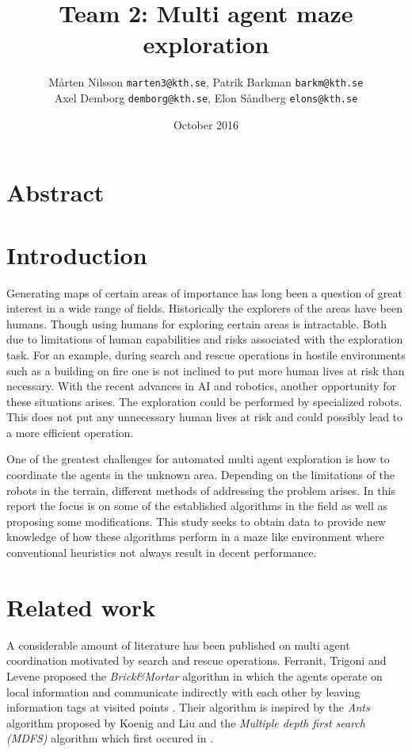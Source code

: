 \documentclass{article}
\title{Team 2: Multi agent maze exploration}
\author{ Mårten Nilsson \texttt{marten3@kth.se}, Patrik Barkman
  \texttt{barkm@kth.se} \\ Axel Demborg \texttt{demborg@kth.se}, Elon Såndberg
  \texttt{elons@kth.se}}
\date{October 2016}
\begin{document}
\maketitle

\section{Abstract}

\section{Introduction}

Generating maps of certain areas of importance has long been a question of great interest in a
wide range of fields. Historically the explorers of the areas have been humans.
Though using humans for exploring certain areas is intractable. Both due to
limitations of human capabilities and risks associated with the exploration
task. For an example, during search and rescue operations in hostile
environments such as a building on fire one is not inclined to put more human
lives at risk than necessary. With the recent advances in AI and robotics,
another opportunity for these situations arises. The exploration could be
performed by specialized robots. This does not put any unnecessary human lives
at risk and could possibly lead to a more efficient operation.

One of the greatest challenges for automated multi agent exploration is how to
coordinate the agents in the unknown area. Depending on the limitations of the
robots in the terrain, different methods of addressing the problem arises. In
this report the focus is on some of the established algorithms in the field as
well as proposing some modifications. This study seeks to obtain data to provide
new knowledge of how these algorithms perform in a maze like environment where
conventional heuristics not always result in decent performance.

\section{Related work}
A considerable amount of literature has been published on multi agent
coordination motivated by search and rescue operations. Ferranit, Trigoni and
Levene proposed the \textit{Brick\&Mortar} algorithm in which the agents operate
on local information and communicate indirectly with each other by leaving
information tags at visited points \cite{ferranti2007brick}. Their algorithm is
inspired by the \textit{Ants} algorithm proposed by Koenig and Liu \cite{koenig2001terrain} and the
\textit{Multiple depth first search (MDFS)} algorithm which first occured in \cite{tarry1895probleme}. 
\end{document}
